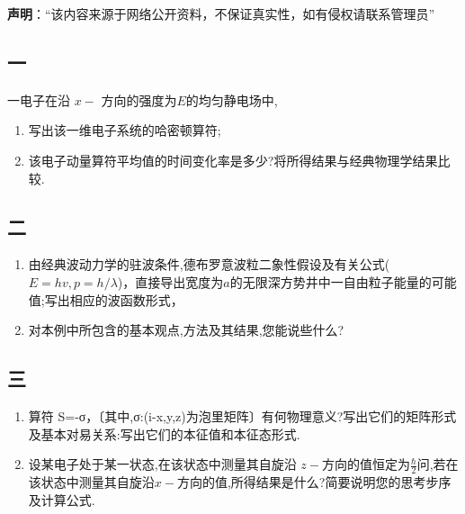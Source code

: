 
\textbf{声明}：“该内容来源于网络公开资料，不保证真实性，如有侵权请联系管理员”

\subsection{一}
一电子在沿 $x-$ 方向的强度为$E$的均匀静电场中,
\begin{enumerate}
\item 写出该一维电子系统的哈密顿算符;
\item 该电子动量算符平均值的时间变化率是多少?将所得结果与经典物理学结果比较.
\end{enumerate}
\subsection{二}
\begin{enumerate}
\item 由经典波动力学的驻波条件,德布罗意波粒二象性假设及有关公式($E=hv,p=h/\lambda$)，直接导出宽度为$a$的无限深方势井中一自由粒子能量的可能值;写出相应的波函数形式，
\item 对本例中所包含的基本观点,方法及其结果,您能说些什么?
\end{enumerate}
\subsection{三}
\begin{enumerate}
\item 算符 S=-σ，〔其中,σ:(i-x,y,z)为泡里矩阵〕有何物理意义?写出它们的矩阵形式及基本对易关系:写出它们的本征值和本征态形式.
\item 设某电子处于某一状态,在该状态中测量其自旋沿 $z-$方向的值恒定为$\frac{\hbar}{2}$问,若在该状态中测量其自旋沿$x-$方向的值,所得结果是什么?简要说明您的思考步序及计算公式.
\end{enumerate}
